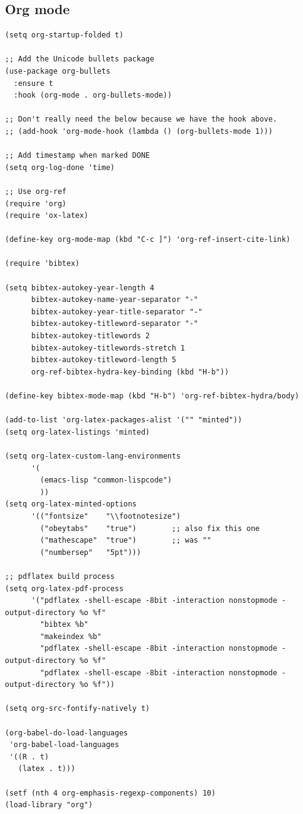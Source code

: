 \documentclass[10pt]{article}
\begin{document}
\subsection{Org mode}
\label{sec:org55d3f87}
\begin{verbatim}
(setq org-startup-folded t)

;; Add the Unicode bullets package
(use-package org-bullets
  :ensure t
  :hook (org-mode . org-bullets-mode))

;; Don't really need the below because we have the hook above.
;; (add-hook 'org-mode-hook (lambda () (org-bullets-mode 1)))

;; Add timestamp when marked DONE
(setq org-log-done 'time)

;; Use org-ref
(require 'org)
(require 'ox-latex)

(define-key org-mode-map (kbd "C-c ]") 'org-ref-insert-cite-link)

(require 'bibtex)

(setq bibtex-autokey-year-length 4
      bibtex-autokey-name-year-separator "-"
      bibtex-autokey-year-title-separator "-"
      bibtex-autokey-titleword-separator "-"
      bibtex-autokey-titlewords 2
      bibtex-autokey-titlewords-stretch 1
      bibtex-autokey-titleword-length 5
      org-ref-bibtex-hydra-key-binding (kbd "H-b"))

(define-key bibtex-mode-map (kbd "H-b") 'org-ref-bibtex-hydra/body)

(add-to-list 'org-latex-packages-alist '("" "minted"))
(setq org-latex-listings 'minted)

(setq org-latex-custom-lang-environments
      '(
        (emacs-lisp "common-lispcode")
        ))
(setq org-latex-minted-options
      '(("fontsize"    "\\footnotesize")
        ("obeytabs"    "true")        ;; also fix this one
        ("mathescape"  "true")        ;; was ""
        ("numbersep"   "5pt")))

;; pdflatex build process
(setq org-latex-pdf-process
      '("pdflatex -shell-escape -8bit -interaction nonstopmode -output-directory %o %f"
        "bibtex %b"
        "makeindex %b"
        "pdflatex -shell-escape -8bit -interaction nonstopmode -output-directory %o %f"
        "pdflatex -shell-escape -8bit -interaction nonstopmode -output-directory %o %f"))

(setq org-src-fontify-natively t)

(org-babel-do-load-languages
 'org-babel-load-languages
 '((R . t)
   (latex . t)))

(setf (nth 4 org-emphasis-regexp-components) 10)
(load-library "org")
\end{verbatim}
\end{document}
